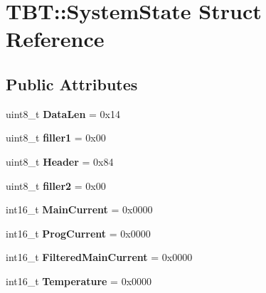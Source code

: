 \hypertarget{structTBT_1_1SystemState}{}\section{T\+BT\+:\+:System\+State Struct Reference}
\label{structTBT_1_1SystemState}
\subsection*{Public Attributes}
\begin{DoxyCompactItemize}
\item 
\mbox{\label{structTBT_1_1SystemState_a17d517bed6954e31982eca5685b36d04}} 
uint8\+\_\+t {\bfseries Data\+Len} = 0x14
\item 
\mbox{\label{structTBT_1_1SystemState_a27329736b0b53fc4239397b4e9a0194c}} 
uint8\+\_\+t {\bfseries filler1} = 0x00
\item 
\mbox{\label{structTBT_1_1SystemState_a2a3724acc75f75f94ea6806fb2d0ad1a}} 
uint8\+\_\+t {\bfseries Header} = 0x84
\item 
\mbox{\label{structTBT_1_1SystemState_a2dbecb920543f10343d2e13fe0900a6c}} 
uint8\+\_\+t {\bfseries filler2} = 0x00
\item 
\mbox{\label{structTBT_1_1SystemState_ad6712d6a9c04e085fd94290b42febf36}} 
int16\+\_\+t {\bfseries Main\+Current} = 0x0000
\item 
\mbox{\label{structTBT_1_1SystemState_a39dae8a3b2f9789ad770cc1deb6c837b}} 
int16\+\_\+t {\bfseries Prog\+Current} = 0x0000
\item 
\mbox{\label{structTBT_1_1SystemState_ab1bba48939b28cea2b000bfb7288f1aa}} 
int16\+\_\+t {\bfseries Filtered\+Main\+Current} = 0x0000
\item 
\mbox{\label{structTBT_1_1SystemState_a88b75704f440bbbf3c854bcb6a7d39dc}} 
int16\+\_\+t {\bfseries Temperature} = 0x0000
\item 
\mbox{\label{structTBT_1_1SystemState_a85f474c9e82ac4f6add54311e7884364}} 

\end{DoxyCompactItemize}

